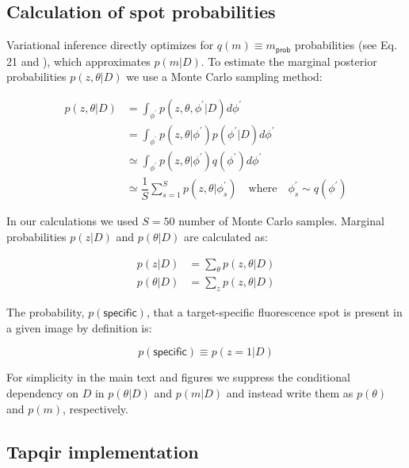 

\subsection{Calculation of spot probabilities}

Variational inference directly optimizes for $q(m) \equiv m_\mathsf{prob}$ probabilities (see Eq. 21 and ), which approximates $p(m | D)$. To estimate the marginal posterior probabilities $p(z, \theta | D)$ we use a Monte Carlo sampling method:

\begin{equation}
\begin{aligned}
    p(z, \theta | D) &= \int_{\phi^{\prime}} p(z, \theta, \phi^{\prime} | D) d\phi^{\prime} \\
    &=  \int_{\phi^{\prime}} p(z, \theta | \phi^{\prime}) p(\phi^{\prime} | D) d\phi^{\prime} \\
    &\simeq \int_{\phi^{\prime}} p(z, \theta | \phi^{\prime}) q(\phi^{\prime}) d\phi^{\prime} \\
    &\simeq \dfrac{1}{S} \sum_{s=1}^{S} p(z, \theta | \phi^{\prime}_s) \quad \text{where} \quad \phi^{\prime}_s \sim q(\phi^{\prime})
\end{aligned}
\end{equation}

In our calculations we used $S = 50$ number of Monte Carlo samples. Marginal probabilities $p(z | D)$ and $p(\theta | D)$ are calculated as:

\begin{subequations}
\begin{align}
    p(z | D) &= \sum_{\theta} p(z, \theta | D) \\
    p(\theta | D) &= \sum_{z} p(z, \theta | D)
\end{align}
\end{subequations}

The probability, $p(\mathsf{specific})$, that a target-specific fluorescence spot is present in a given image by definition is:

\begin{equation}
    p(\mathsf{specific}) \equiv p(z = 1 | D)
\end{equation}

For simplicity in the main text and figures we suppress the conditional dependency on $D$ in $p(\theta | D)$ and $p(m | D)$ and instead write them as $p(\theta)$ and $p(m)$, respectively.

\subsection{Tapqir implementation}

